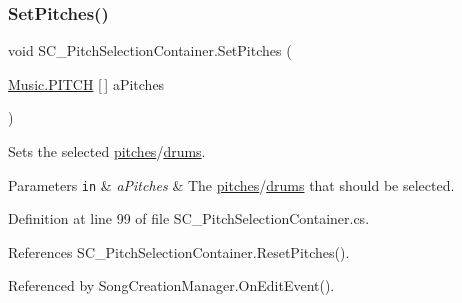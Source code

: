 \subsubsection{\texorpdfstring{Set\+Pitches()}{SetPitches()}}
{\footnotesize\ttfamily void S\+C\+\_\+\+Pitch\+Selection\+Container.\+Set\+Pitches (\begin{DoxyParamCaption}\item[{\hyperlink{group___music_enums_ga508f69b199ea518f935486c990edac1d}{Music.\+P\+I\+T\+CH} \mbox{[}$\,$\mbox{]}}]{a\+Pitches }\end{DoxyParamCaption})}



Sets the selected \hyperlink{group___music_enums_ga508f69b199ea518f935486c990edac1d}{pitches}/\hyperlink{group___music_enums_gade475b4382c7066d1af13e7c13c029b6}{drums}. 


\begin{DoxyParams}[1]{Parameters}
\mbox{\tt in}  & {\em a\+Pitches} & The \hyperlink{group___music_enums_ga508f69b199ea518f935486c990edac1d}{pitches}/\hyperlink{group___music_enums_gade475b4382c7066d1af13e7c13c029b6}{drums} that should be selected. \\
\hline
\end{DoxyParams}


Definition at line 99 of file S\+C\+\_\+\+Pitch\+Selection\+Container.\+cs.



References S\+C\+\_\+\+Pitch\+Selection\+Container.\+Reset\+Pitches().



Referenced by Song\+Creation\+Manager.\+On\+Edit\+Event().


